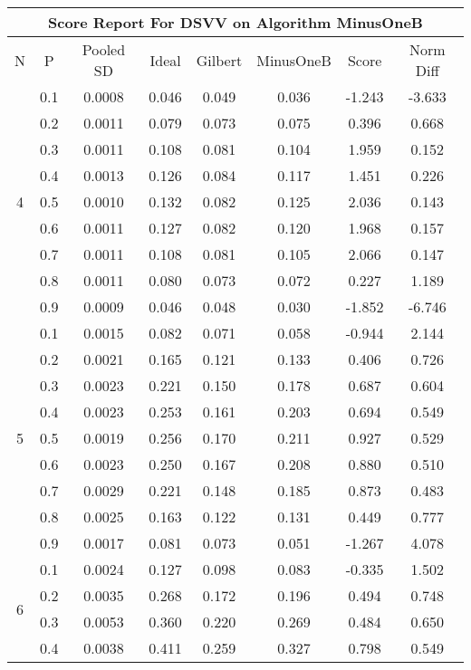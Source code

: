 \documentclass[11pt,a4paper]{report}
\begin{document}
\begin{longtable}{ | c | c || c | c | c | c | c | c | }
\hline
\multicolumn{8}{|c|}{ Score Report For DSVV on Algorithm MinusOneB} \\
\hline
N & P & Pooled SD &  Ideal &  Gilbert & MinusOneB  & Score & Norm Diff \\
 \hline
 \hline
 \endhead
\multirow{9}{*}{4} & 0.1 & 0.0008 & 0.046 & 0.049 & 0.036 & -1.243 & -3.633 \\
 & 0.2 & 0.0011 & 0.079 & 0.073 & 0.075 & 0.396 & 0.668 \\
 & 0.3 & 0.0011 & 0.108 & 0.081 & 0.104 & 1.959 & 0.152 \\
 & 0.4 & 0.0013 & 0.126 & 0.084 & 0.117 & 1.451 & 0.226 \\
 & 0.5 & 0.0010 & 0.132 & 0.082 & 0.125 & 2.036 & 0.143 \\
 & 0.6 & 0.0011 & 0.127 & 0.082 & 0.120 & 1.968 & 0.157 \\
 & 0.7 & 0.0011 & 0.108 & 0.081 & 0.105 & 2.066 & 0.147 \\
 & 0.8 & 0.0011 & 0.080 & 0.073 & 0.072 & 0.227 & 1.189 \\
 & 0.9 & 0.0009 & 0.046 & 0.048 & 0.030 & -1.852 & -6.746 \\
 \hline
\multirow{9}{*}{5} & 0.1 & 0.0015 & 0.082 & 0.071 & 0.058 & -0.944 & 2.144 \\
 & 0.2 & 0.0021 & 0.165 & 0.121 & 0.133 & 0.406 & 0.726 \\
 & 0.3 & 0.0023 & 0.221 & 0.150 & 0.178 & 0.687 & 0.604 \\
 & 0.4 & 0.0023 & 0.253 & 0.161 & 0.203 & 0.694 & 0.549 \\
 & 0.5 & 0.0019 & 0.256 & 0.170 & 0.211 & 0.927 & 0.529 \\
 & 0.6 & 0.0023 & 0.250 & 0.167 & 0.208 & 0.880 & 0.510 \\
 & 0.7 & 0.0029 & 0.221 & 0.148 & 0.185 & 0.873 & 0.483 \\
 & 0.8 & 0.0025 & 0.163 & 0.122 & 0.131 & 0.449 & 0.777 \\
 & 0.9 & 0.0017 & 0.081 & 0.073 & 0.051 & -1.267 & 4.078 \\
 \hline
\multirow{9}{*}{6} & 0.1 & 0.0024 & 0.127 & 0.098 & 0.083 & -0.335 & 1.502 \\
 & 0.2 & 0.0035 & 0.268 & 0.172 & 0.196 & 0.494 & 0.748 \\
 & 0.3 & 0.0053 & 0.360 & 0.220 & 0.269 & 0.484 & 0.650 \\
 & 0.4 & 0.0038 & 0.411 & 0.259 & 0.327 & 0.798 & 0.549 \\

\end{longtable}
\end{document}
